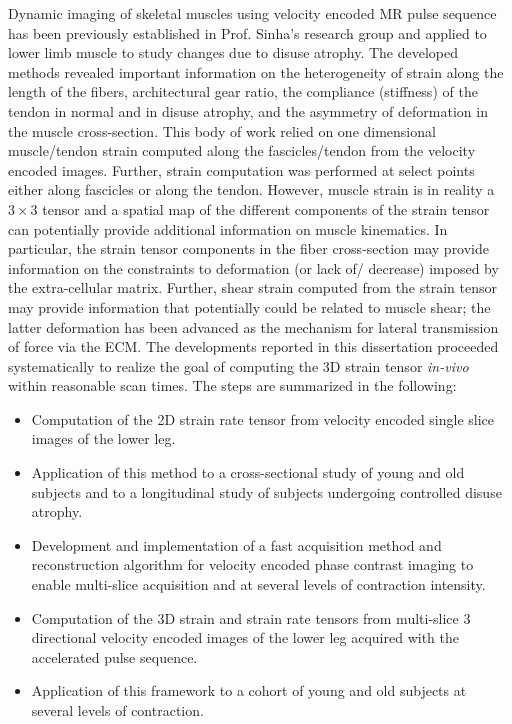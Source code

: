 Dynamic imaging of skeletal muscles using velocity encoded MR pulse sequence has been previously established in Prof. Sinha's research group and applied to lower limb muscle to study changes due to disuse atrophy. 
The developed methods revealed important information on the heterogeneity of strain along the length of the fibers, architectural gear ratio, the compliance (stiffness) of the tendon in normal and in disuse atrophy, and the asymmetry of deformation in the muscle cross-section. 
This body of work relied on one dimensional muscle/tendon strain computed along the fascicles/tendon from the velocity encoded images. 
Further, strain computation was performed at select points either along fascicles or along the tendon. 
However, muscle strain is in reality a $3 \times 3$ tensor and a spatial map of the different components of the strain tensor can potentially provide additional information on muscle kinematics. 
In particular, the strain tensor components in the fiber cross-section may provide information on the constraints to deformation (or lack of/ decrease) imposed by the extra-cellular matrix. 
Further, shear strain computed from the strain tensor may provide information that potentially could be related to muscle shear; the latter deformation has been advanced as the mechanism for lateral transmission of force via the ECM. 
The developments reported in this dissertation proceeded systematically to realize the goal of computing the 3D strain tensor \textit{in-vivo} within reasonable scan times. 
The steps are summarized in the following: 
\begin{itemize}
\item Computation of the 2D strain rate tensor from velocity encoded single slice images of the lower leg.
\item Application of this method to a cross-sectional study of young and old subjects and to a longitudinal study of subjects undergoing controlled disuse atrophy.
\item Development and implementation of a fast acquisition method and reconstruction algorithm for velocity encoded phase contrast imaging to enable multi-slice acquisition and at several levels of contraction intensity.
\item Computation of the 3D strain and strain rate tensors from multi-slice 3 directional velocity encoded images of the lower leg acquired with the accelerated pulse sequence.
\item Application of this framework to a cohort of young and old subjects at several levels of contraction.	
\end{itemize}

